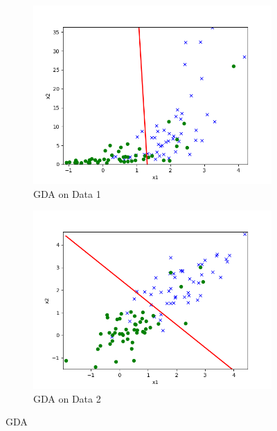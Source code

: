 \begin{answer}

\begin{figure}[h!]
\centering
\begin{subfigure}{.5\textwidth}
  \centering
  \includegraphics[width=.5\linewidth]{linearclass/gda_pred_1.png}
  \caption{GDA on Data 1}
  \label{fig:sub1}
\end{subfigure}%
\begin{subfigure}{.5\textwidth}
  \centering
  \includegraphics[width=.5\linewidth]{linearclass/gda_pred_2.png}
  \caption{GDA on Data 2}
  \label{fig:sub2}
\end{subfigure}
\caption{GDA}
\label{fig:test}
\end{figure}
\end{answer}
